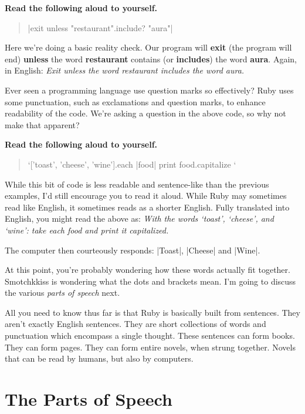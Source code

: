 \documentclass[12pt,twoside]{report}
\begin{document}
\newpage

{\bf Read the following aloud to yourself.}

\begin{quote}
\rubyinline|exit unless "restaurant".include? "aura"|\end{quote}


Here we're doing a basic reality check.  Our program will {\bf exit}
(the program will end) {\bf unless} the word {\bf restaurant} contains
(or {\bf includes}) the word {\bf aura}.  Again, in English: {\em Exit
  unless the word restaurant includes the word aura.}

Ever seen a programming language use question marks so effectively?
Ruby uses some punctuation, such as exclamations and question marks,
to enhance readability of the code.  We're asking a question in the
above code, so why not make that apparent?

{\bf Read the following aloud to yourself.}

\begin{quote}
\rubyinline`['toast', 'cheese', 'wine'].each { |food|  print food.capitalize }`\end{quote}

While this bit of code is less readable and sentence-like than the
previous examples, I'd still encourage you to read it aloud.  While
Ruby may sometimes read like English, it sometimes reads as a shorter
English.  Fully translated into English, you might read the above as:
{\em With the words `toast', `cheese', and `wine': take each food and
  print it capitalized.}

The computer then courteously responds:
\rubyinline|Toast|,
\rubyinline|Cheese| and
\rubyinline|Wine|.

At this point, you're probably wondering how these words actually fit
together.  Smotchkkiss is wondering what the dots and brackets mean.
I'm going to discuss the various {\em parts of speech} next.

All you need to know thus far is that Ruby is basically built from
sentences.  They aren't exactly English sentences.  They are short
collections of words and punctuation which encompass a single thought.
These sentences can form books.  They can form pages.  They can form
entire novels, when strung together. Novels that can be read by
humans, but also by computers.


\section{The Parts of Speech}
\end{document}
